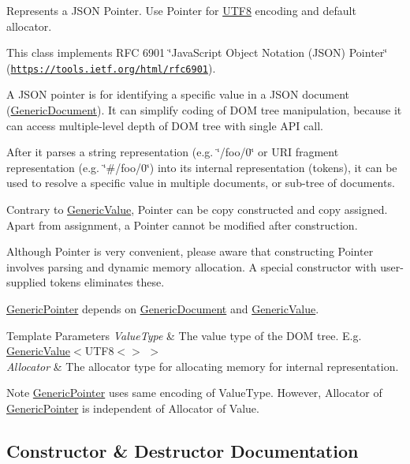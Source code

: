 Represents a J\+S\+ON Pointer. Use Pointer for \hyperlink{structUTF8}{U\+T\+F8} encoding and default allocator. 

This class implements R\+FC 6901 \char`\"{}\+Java\+Script Object Notation (\+J\+S\+O\+N) Pointer\char`\"{} (\href{https://tools.ietf.org/html/rfc6901}{\tt https\+://tools.\+ietf.\+org/html/rfc6901}).

A J\+S\+ON pointer is for identifying a specific value in a J\+S\+ON document (\hyperlink{classGenericDocument}{Generic\+Document}). It can simplify coding of D\+OM tree manipulation, because it can access multiple-\/level depth of D\+OM tree with single A\+PI call.

After it parses a string representation (e.\+g. \char`\"{}/foo/0\char`\"{} or U\+RI fragment representation (e.\+g. \char`\"{}\#/foo/0\char`\"{}) into its internal representation (tokens), it can be used to resolve a specific value in multiple documents, or sub-\/tree of documents.

Contrary to \hyperlink{classGenericValue}{Generic\+Value}, Pointer can be copy constructed and copy assigned. Apart from assignment, a Pointer cannot be modified after construction.

Although Pointer is very convenient, please aware that constructing Pointer involves parsing and dynamic memory allocation. A special constructor with user-\/ supplied tokens eliminates these.

\hyperlink{classGenericPointer}{Generic\+Pointer} depends on \hyperlink{classGenericDocument}{Generic\+Document} and \hyperlink{classGenericValue}{Generic\+Value}.


\begin{DoxyTemplParams}{Template Parameters}
{\em Value\+Type} & The value type of the D\+OM tree. E.\+g. \hyperlink{classGenericValue}{Generic\+Value}$<$U\+T\+F8$<$$>$ $>$ \\
\hline
{\em Allocator} & The allocator type for allocating memory for internal representation.\\
\hline
\end{DoxyTemplParams}
\begin{DoxyNote}{Note}
\hyperlink{classGenericPointer}{Generic\+Pointer} uses same encoding of Value\+Type. However, Allocator of \hyperlink{classGenericPointer}{Generic\+Pointer} is independent of Allocator of Value. 
\end{DoxyNote}


\subsection{Constructor \& Destructor Documentation}
